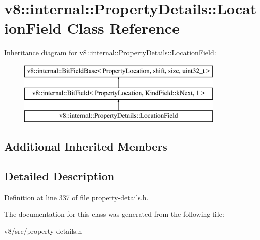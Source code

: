 \hypertarget{classv8_1_1internal_1_1PropertyDetails_1_1LocationField}{}\section{v8\+:\+:internal\+:\+:Property\+Details\+:\+:Location\+Field Class Reference}
\label{classv8_1_1internal_1_1PropertyDetails_1_1LocationField}
Inheritance diagram for v8\+:\+:internal\+:\+:Property\+Details\+:\+:Location\+Field\+:\begin{figure}[H]
\begin{center}
\leavevmode
\includegraphics[height=3.000000cm]{classv8_1_1internal_1_1PropertyDetails_1_1LocationField}
\end{center}
\end{figure}
\subsection*{Additional Inherited Members}


\subsection{Detailed Description}


Definition at line 337 of file property-\/details.\+h.



The documentation for this class was generated from the following file\+:\begin{DoxyCompactItemize}
\item 
v8/src/property-\/details.\+h\end{DoxyCompactItemize}
